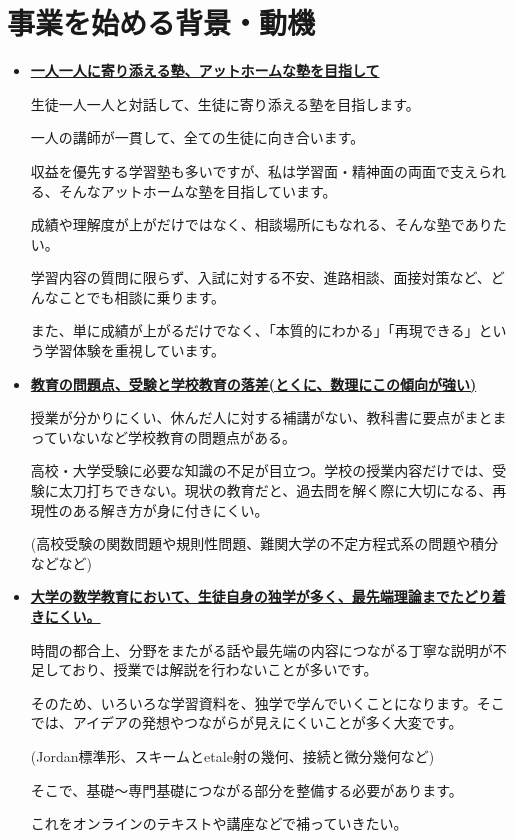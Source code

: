 ﻿\documentclass[12pt]{article}
\begin{document}
\section{事業を始める背景・動機}
\begin{itemize}[leftmargin=1.5em, itemsep=3mm, parsep=4pt]
\item \uline{\textbf{一人一人に寄り添える塾、アットホームな塾を目指して}}

生徒一人一人と対話して、生徒に寄り添える塾を目指します。

一人の講師が一貫して、全ての生徒に向き合います。

収益を優先する学習塾も多いですが、私は学習面・精神面の両面で支えられる、そんなアットホームな塾を目指しています。

成績や理解度が上がだけではなく、相談場所にもなれる、そんな塾でありたい。


学習内容の質問に限らず、入試に対する不安、進路相談、面接対策など、どんなことでも相談に乗ります。

また、単に成績が上がるだけでなく、「本質的にわかる」「再現できる」という学習体験を重視しています。

\item \uline{\textbf{教育の問題点、受験と学校教育の落差(とくに、数理にこの傾向が強い)}}

授業が分かりにくい、休んだ人に対する補講がない、教科書に要点がまとまっていないなど学校教育の問題点がある。

高校・大学受験に必要な知識の不足が目立つ。学校の授業内容だけでは、受験に太刀打ちできない。現状の教育だと、過去問を解く際に大切になる、再現性のある解き方が身に付きにくい。

(高校受験の関数問題や規則性問題、難関大学の不定方程式系の問題や積分などなど)

\item \uline{\textbf{大学の数学教育において、生徒自身の独学が多く、最先端理論までたどり着きにくい。}}

時間の都合上、分野をまたがる話や最先端の内容につながる丁寧な説明が不足しており、授業では解説を行わないことが多いです。

そのため、いろいろな学習資料を、独学で学んでいくことになります。そこでは、アイデアの発想やつながらが見えにくいことが多く大変です。

(Jordan標準形、スキームとetale射の幾何、接続と微分幾何など)

そこで、基礎～専門基礎につながる部分を整備する必要があります。

これをオンラインのテキストや講座などで補っていきたい。


\end{itemize}
\end{document}
